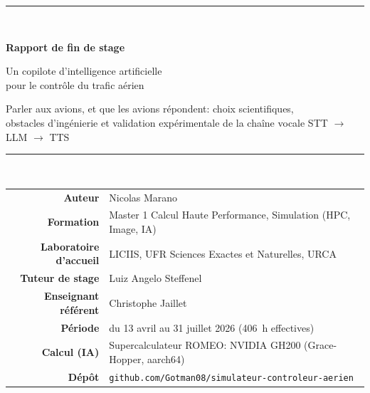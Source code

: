 \documentclass[11pt,a4paper]{article}
\begin{document}
\begin{titlepage}
\centering
\vspace*{1.0cm}
{\color{atcblue}\rule{\textwidth}{2pt}}\\[0.5cm]
{\Huge\bfseries\color{atcblue} Rapport de fin de stage\par}
\vspace{0.35cm}
{\LARGE\color{atcteal} Un copilote d'intelligence artificielle\\pour le contrôle du trafic aérien\par}
\vspace{0.25cm}
{\large Parler aux avions, et que les avions répondent: choix scientifiques,\\[2pt] obstacles d'ingénierie et validation expérimentale de la chaîne vocale STT $\rightarrow$ LLM $\rightarrow$ TTS\par}
\vspace{0.4cm}
{\color{atcblue}\rule{\textwidth}{2pt}}\\[0.9cm]

{\small
\begin{tabular}{rl}
\bfseries Auteur & Nicolas Marano\\[4pt]
\bfseries Formation & Master 1 Calcul Haute Performance, Simulation (HPC, Image, IA)\\[4pt]
\bfseries Laboratoire d'accueil & LICIIS, UFR Sciences Exactes et Naturelles, URCA\\[4pt]
\bfseries Tuteur de stage & Luiz Angelo Steffenel\\[4pt]
\bfseries Enseignant référent & Christophe Jaillet\\[4pt]
\bfseries Période & du 13 avril au 31 juillet 2026 (406~h effectives)\\[4pt]
\bfseries Calcul (IA) & Supercalculateur ROMEO: NVIDIA GH200 (Grace-Hopper, aarch64)\\[4pt]
\bfseries Dépôt & \texttt{github.com/Gotman08/simulateur-controleur-aerien}\\
\end{tabular}}


\end{titlepage}
\end{document}
